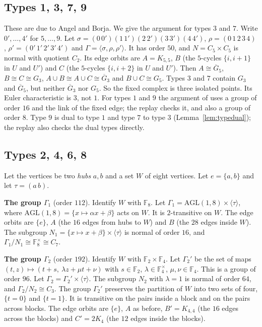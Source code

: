 \documentclass[11pt]{article}
\theoremstyle{plain}
\theoremstyle{definition}
\theoremstyle{remark}
\newcommand{\F}{\mathbb F}
\begin{document}
\subsection{Types 1, 3, 7, 9}\label{sec:t1379}

These are due to Angel and Borja.
We give the argument for types $3$ and $7$.
Write $0',\dots,4'$ for $5,\dots,9$.
Let $\sigma=(0\,0')(1\,1')(2\,2')(3\,3')(4\,4')$, $\rho=(0\,1\,2\,3\,4)$, $\rho'=(0'\,1'\,2'\,3'\,4')$ and $\Gamma=\langle\sigma,\rho,\rho'\rangle$.
It has order $50$, and $N=C_5\times C_5$ is normal with quotient $C_2$.
Its edge orbits are $A=K_{5,5}$, $B$ (the $5$-cycles $\{i,i+1\}$ in $U$ and $U'$) and $C$ (the $5$-cycles $\{i,i+2\}$ in $U$ and $U'$).
Then $A\cong\overline G_5$, $B\cong C\cong G_3$, $A\cup B\cong A\cup C\cong\overline G_3$ and $B\cup C\cong G_5$.
Types $3$ and $7$ contain $G_3$ and $\overline G_5$, but neither $\overline G_3$ nor $G_5$.
So the fixed complex is three isolated points.
Its Euler characteristic is $3$, not $1$.
For types $1$ and $9$ the argument of \cite{AB} uses a group of order $16$ and the link of the fixed edge; the replay checks it, and also a group of order $8$.
Type $9$ is dual to type $1$ and type $7$ to type $3$ (Lemma~\ref{lem:typedual}); the replay also checks the dual types directly.

\subsection{Types 2, 4, 6, 8}\label{sec:t2468}

Let the vertices be two \emph{hubs} $a,b$ and a set $W$ of eight vertices.
Let $e=\{a,b\}$ and let $\tau=(a\,b)$.

\smallskip\noindent
\textbf{The group $\Gamma_1$} (order $112$).
Identify $W$ with $\F_8$.
Let $\Gamma_1=\mathrm{AGL}(1,8)\times\langle\tau\rangle$, where $\mathrm{AGL}(1,8)=\{x\mapsto\alpha x+\beta\}$ acts on $W$.
It is $2$-transitive on $W$.
The edge orbits are $\{e\}$, $A$ (the $16$ edges from hubs to $W$) and $B$ (the $28$ edges inside $W$).
The subgroup $N_1=\{x\mapsto x+\beta\}\times\langle\tau\rangle$ is normal of order $16$, and $\Gamma_1/N_1\cong\F_8^\times\cong C_7$.

\smallskip\noindent
\textbf{The group $\Gamma_2$} (order $192$).
Identify $W$ with $\F_2\times\F_4$.
Let $\Gamma_2'$ be the set of maps $(t,z)\mapsto(t+s,\ \lambda z+\mu t+\nu)$ with $s\in\F_2$, $\lambda\in\F_4^\times$, $\mu,\nu\in\F_4$.
This is a group of order $96$.
Let $\Gamma_2=\Gamma_2'\times\langle\tau\rangle$.
The subgroup $N_2$ with $\lambda=1$ is normal of order $64$, and $\Gamma_2/N_2\cong C_3$.
The group $\Gamma_2'$ preserves the partition of $W$ into two sets of four, $\{t=0\}$ and $\{t=1\}$.
It is transitive on the pairs inside a block and on the pairs across blocks.
The edge orbits are $\{e\}$, $A$ as before, $B'=K_{4,4}$ (the $16$ edges across the blocks) and $C'=2K_4$ (the $12$ edges inside the blocks).
\end{document}
